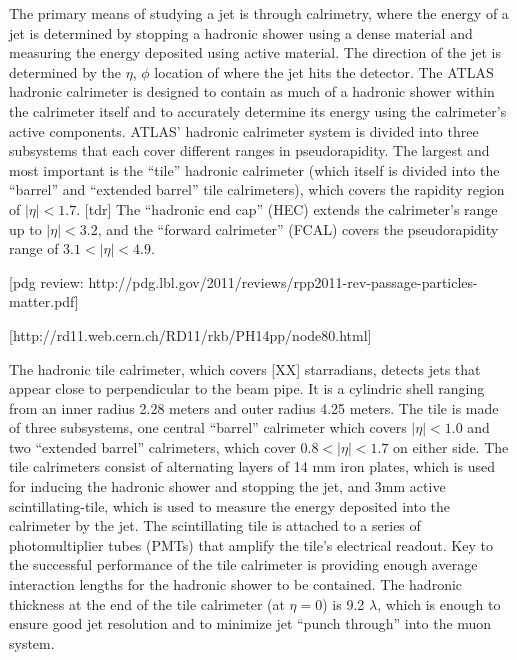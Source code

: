 The primary means of studying a jet is through calrimetry, where the energy of a jet is determined by stopping a hadronic shower using a dense material and measuring the energy deposited using active material.
The direction of the jet is determined by the  $\eta$, $\phi$ location of where the jet hits the detector.
The ATLAS hadronic calrimeter is designed to contain as much of a hadronic shower within the calrimeter itself and to accurately determine its energy using the calrimeter's active components.
ATLAS' hadronic calrimeter system is divided into three subsystems that each cover different ranges in pseudorapidity.  
The largest and most important is the ``tile'' hadronic calrimeter (which itself is divided into the ``barrel'' and ``extended barrel'' tile calrimeters), which covers the rapidity region of $|\eta| < 1.7$. [tdr]  
The ``hadronic end cap'' (HEC) extends the calrimeter's range up to $|\eta| < 3.2$, and the ``forward calrimeter'' (FCAL) covers the pseudorapidity range of $3.1 < |\eta| < 4.9$.  

[pdg review: http://pdg.lbl.gov/2011/reviews/rpp2011-rev-passage-particles-matter.pdf]

[http://rd11.web.cern.ch/RD11/rkb/PH14pp/node80.html]

The hadronic tile calrimeter, which covers [XX] starradians, detects jets that appear close to perpendicular to the beam pipe.
It is a cylindric shell ranging from an inner radius 2.28 meters and outer radius 4.25 meters.
The tile is made of three subsystems, one central ``barrel'' calrimeter which covers $|\eta| < 1.0$ and two ``extended barrel'' calrimeters, which cover $0.8 < |\eta| < 1.7$ on either side.
The tile calrimeters consist of alternating layers of 14 mm iron plates, which is used for inducing the hadronic shower and stopping the jet, and 3mm active scintillating-tile, which is used to measure the energy deposited into the calrimeter by the jet.
The scintillating tile is attached to a series of photomultiplier tubes (PMTs) that amplify the tile's electrical readout.
Key to the successful performance of the tile calrimeter is providing enough average interaction lengths for the hadronic shower to be contained.
The hadronic thickness at the end of the tile calrimeter (at $\eta=0$) is 9.2 $\lambda$, which is enough to ensure good jet resolution and to minimize jet ``punch through'' into the muon system.



